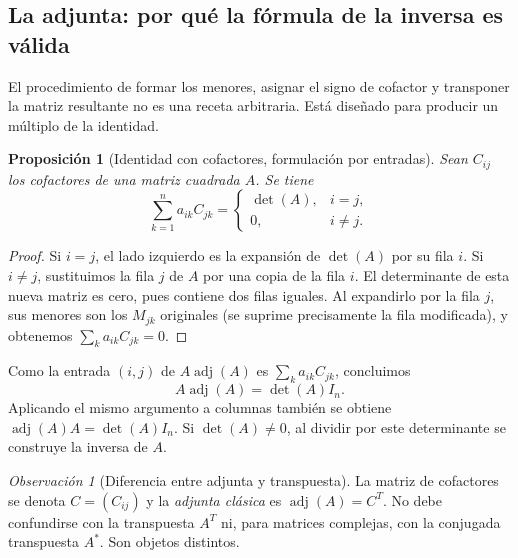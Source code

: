 \documentclass[12pt]{article}
\newtheorem{proposicion}[definicion]{Proposición}
\theoremstyle{remark}
\newtheorem{observacion}[definicion]{Observación}
\begin{document}
\subsection{La adjunta: por qué la fórmula de la inversa es válida}
El procedimiento de formar los menores, asignar el signo de cofactor y transponer la matriz resultante no es una receta arbitraria. Está diseñado para producir un múltiplo de la identidad.
\begin{proposicion}[Identidad con cofactores, formulación por entradas]
Sean $C_{ij}$ los cofactores de una matriz cuadrada $A$. Se tiene
\[
\sum_{k=1}^{n}a_{ik}C_{jk}=\begin{cases}\det(A),&i=j,\\0,&i\ne j.\end{cases}
\]
\end{proposicion}
\begin{proof}
Si $i=j$, el lado izquierdo es la expansión de $\det(A)$ por su fila $i$. Si $i\ne j$, sustituimos la fila $j$ de $A$ por una copia de la fila $i$. El determinante de esta nueva matriz es cero, pues contiene dos filas iguales. Al expandirlo por la fila $j$, sus menores son los $M_{jk}$ originales (se suprime precisamente la fila modificada), y obtenemos $\sum_k a_{ik}C_{jk}=0$.
\end{proof}
Como la entrada $(i,j)$ de $A\operatorname{adj}(A)$ es $\sum_k a_{ik}C_{jk}$, concluimos
\[
\boxed{A\operatorname{adj}(A)=\det(A)I_n.}
\]
Aplicando el mismo argumento a columnas también se obtiene $\operatorname{adj}(A)A=\det(A)I_n$. Si $\det(A)\ne0$, al dividir por este determinante se construye la inversa de $A$.

\begin{observacion}[Diferencia entre adjunta y transpuesta]
La matriz de cofactores se denota $C=(C_{ij})$ y la \emph{adjunta clásica} es $\operatorname{adj}(A)=C^T$. No debe confundirse con la transpuesta $A^T$ ni, para matrices complejas, con la conjugada transpuesta $A^*$. Son objetos distintos.
\end{observacion}
\end{document}
